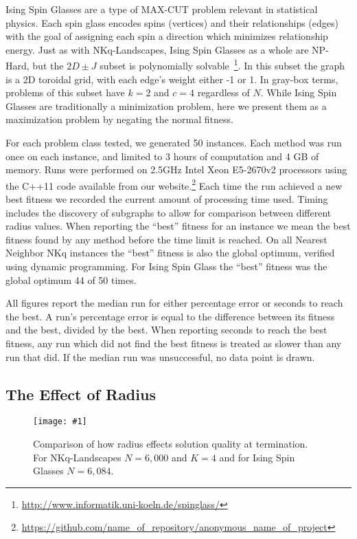 \documentclass{sig-alternate}
\newcommand{\includegraphicswide}[1]
{\texttt{[image: \#1]}}
\begin{document}
Ising Spin Glasses are a type of MAX-CUT problem relevant in statistical physics. Each spin glass
encodes spins (vertices) and their relationships (edges) with the goal of assigning each spin a direction
which minimizes relationship energy. Just as with NKq-Landscapes, Ising Spin Glasses as a whole
are NP-Hard, but the $2D\pm J$ subset is polynomially solvable~\cite{saul:1994:spinglass}\footnote{\url{http://www.informatik.uni-koeln.de/spinglass/}}. In this
subset the graph is a 2D toroidal grid, with each edge's weight either -1 or 1. In gray-box terms,
problems of this subset have $k=2$ and $c=4$ regardless of $N$. While Ising Spin Glasses are traditionally
a minimization problem, here we present them as a maximization problem by negating the normal fitness.

For each problem class tested, we generated 50 instances.
Each method was run once on each instance, and limited to 3 hours of computation and 4 GB of memory.
Runs were performed on 2.5GHz Intel Xeon E5-2670v2 processors using the C++11 code available
from our website.\footnote{\url{https://github.com/name_of_repository/anonymous_name_of_project}}
Each time the run achieved a new best fitness we recorded the current amount of processing time used.
Timing includes the discovery of subgraphs to allow for comparison between different radius values.
When reporting the ``best'' fitness for an instance we mean the best fitness found by any method before
the time limit is reached. On all Nearest Neighbor NKq instances the ``best'' fitness
is also the global optimum, verified using dynamic programming. For Ising Spin Glass the ``best'' fitness
was the global optimum 44 of 50 times.

All figures report the median run for either percentage error or seconds to reach the best. A run's percentage error is
equal to the difference between its fitness and the best, divided by the best. When reporting seconds
to reach the best fitness, any run which did not find the best fitness is treated as slower than any run that did.
If the median run was unsuccessful, no data point is drawn.

\subsection{The Effect of Radius}
\label{sec-radius}
\begin{figure*}
  \centering
  \includegraphicswide{fitness}
  \caption{Comparison of how radius effects solution quality at termination. For NKq-Landscapes $N=6,000$ and $K=4$ and
  for Ising Spin Glasses $N=6,084$.}
  \label{fig-fitness}
\end{figure*}
\end{document}
